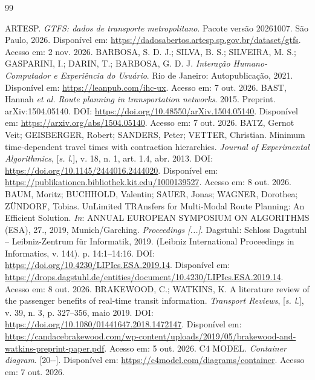 \documentclass[12pt,oneside,a4paper,brazil,chapter=TITLE]{abntex2}
\begin{document}
\postextual
\begin{thebibliography}{99}
\SingleSpacing\raggedright
{} ARTESP. \textit{GTFS: dados de transporte metropolitano}. Pacote versão 20261007. São Paulo, 2026. Disponível em: \url{https://dadosabertos.artesp.sp.gov.br/dataset/gtfs}. Acesso em: 2 nov. 2026.
 BARBOSA, S. D. J.; SILVA, B. S.; SILVEIRA, M. S.; GASPARINI, I.; DARIN, T.; BARBOSA, G. D. J. \textit{Interação Humano-Computador e Experiência do Usuário}. Rio de Janeiro: Autopublicação, 2021. Disponível em: \url{https://leanpub.com/ihc-ux}. Acesso em: 7 out. 2026.
 BAST, Hannah \textit{et al.} \textit{Route planning in transportation networks}. 2015. Preprint. arXiv:1504.05140. DOI: \url{https://doi.org/10.48550/arXiv.1504.05140}. Disponível em: \url{https://arxiv.org/abs/1504.05140}. Acesso em: 7 out. 2026.
 BATZ, Gernot Veit; GEISBERGER, Robert; SANDERS, Peter; VETTER, Christian. Minimum time-dependent travel times with contraction hierarchies. \textit{Journal of Experimental Algorithmics}, [\textit{s. l.}], v. 18, n. 1, art. 1.4, abr. 2013. DOI: \url{https://doi.org/10.1145/2444016.2444020}. Disponível em: \url{https://publikationen.bibliothek.kit.edu/1000139527}. Acesso em: 8 out. 2026.
 BAUM, Moritz; BUCHHOLD, Valentin; SAUER, Jonas; WAGNER, Dorothea; ZÜNDORF, Tobias. UnLimited TRAnsfers for Multi-Modal Route Planning: An Efficient Solution. \textit{In}: ANNUAL EUROPEAN SYMPOSIUM ON ALGORITHMS (ESA), 27., 2019, Munich/Garching. \textit{Proceedings [...]}. Dagstuhl: Schloss Dagstuhl -- Leibniz-Zentrum für Informatik, 2019. (Leibniz International Proceedings in Informatics, v. 144). p. 14:1--14:16. DOI: \url{https://doi.org/10.4230/LIPIcs.ESA.2019.14}. Disponível em: \url{https://drops.dagstuhl.de/entities/document/10.4230/LIPIcs.ESA.2019.14}. Acesso em: 8 out. 2026.
 BRAKEWOOD, C.; WATKINS, K. A literature review of the passenger benefits of real-time transit information. \textit{Transport Reviews}, [\textit{s. l.}], v. 39, n. 3, p. 327--356, maio 2019. DOI: \url{https://doi.org/10.1080/01441647.2018.1472147}. Disponível em: \url{https://candacebrakewood.com/wp-content/uploads/2019/05/brakewood-and-watkins-preprint-paper.pdf}. Acesso em: 5 out. 2026.
 C4 MODEL. \textit{Container diagram}. [20\mbox{-}\mbox{-}]. Disponível em: \url{https://c4model.com/diagrams/container}. Acesso em: 7 out. 2026.

\end{thebibliography}
\end{document}
